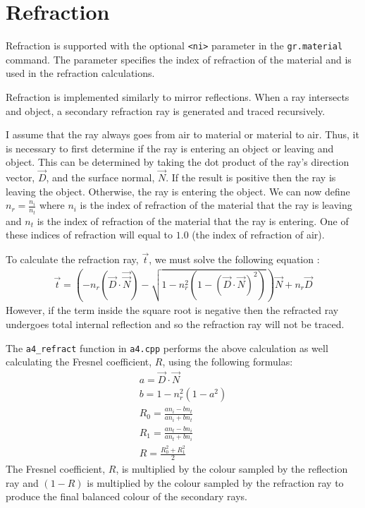 \section{Refraction}

Refraction is supported with the optional \verb|<ni>| parameter in the
\newline \verb|gr.material| command. The parameter specifies the index 
of refraction of the material and is used in the refraction calculations.

Refraction is implemented similarly to mirror reflections. When a ray intersects
and object, a secondary refraction ray is generated and traced recursively.

I assume that the ray always goes from air to material or material to air. Thus,
it is necessary to first determine if the ray is entering an object or leaving
and object. This can be determined by taking the dot product of the ray's
direction vector, $\vec{D}$,  and the surface normal, $\vec{N}$. If the result 
is positive then the ray is leaving the object. Otherwise, the ray is entering 
the object. We can now define $n_{r} = \frac{n_{i}}{n_{t}}$ where $n_{i}$ is the 
index of refraction of the material that the ray is leaving and $n_{t}$ is the 
index of refraction of the material that the ray is entering. One of these 
indices of refraction will equal to $1.0$ (the index of refraction of air).

To calculate the refraction ray, $\vec{t}$, we must solve the following 
equation \cite{4_de_greve_2006}:
\begin{equation}
\begin{split}
  \vec{t} = (-n_{r}(\vec{D}\cdot\vec\vec{N}) - \sqrt{1 - n_{r}^2(1 -
  (\vec{D}\cdot\vec{N})^2)})\vec{N} + n_{r}\vec{D}
\end{split}
\end{equation}
However, if the term inside the square root is negative then the refracted ray
undergoes total internal reflection and so the refraction ray will not be
traced.

The \verb|a4_refract| function in \verb|a4.cpp| performs the above calculation
as well calculating the Fresnel coefficient, $R$, using the following formulas:
\begin{equation}
\begin{split}
  a = \vec{D}\cdot\vec{N} \\
  b = 1 - n_{r}^2(1 - a^2) \\
  R_{0} = \frac{an_{i} - bn_{t}}{an_{i} + bn_{t}} \\
  R_{1} = \frac{an_{t} - bn_{i}}{an_{t} + bn_{i}} \\
  R = \frac{R_{0}^2 + R_{1}^2}{2}
\end{split}
\end{equation}
The Fresnel coefficient, $R$, is multiplied by the colour sampled by the
reflection ray and $(1 - R)$ is multiplied by the colour sampled by the
refraction ray to produce the final balanced colour of the secondary rays.

